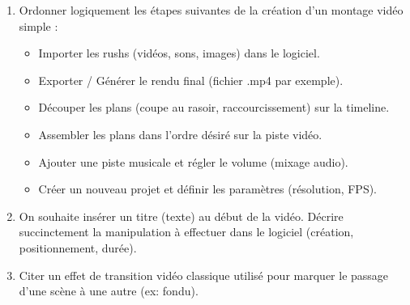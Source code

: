 \documentclass[11pt]{article}
\begin{document}
\begin{exercice}
\begin{enumerate}
    \item Ordonner logiquement les étapes suivantes de la création d'un montage vidéo simple :
    \begin{itemize}
        \item[A] Importer les rushs (vidéos, sons, images) dans le logiciel.
        \item[B] Exporter / Générer le rendu final (fichier .mp4 par exemple).
        \item[C] Découper les plans (coupe au rasoir, raccourcissement) sur la timeline.
        \item[D] Assembler les plans dans l'ordre désiré sur la piste vidéo.
        \item[E] Ajouter une piste musicale et régler le volume (mixage audio).
        \item[F] Créer un nouveau projet et définir les paramètres (résolution, FPS).
    \end{itemize}
    \item On souhaite insérer un titre (texte) au début de la vidéo. Décrire succinctement la manipulation à effectuer dans le logiciel (création, positionnement, durée).
    \item Citer un effet de transition vidéo classique utilisé pour marquer le passage d'une scène à une autre (ex: fondu).
\end{enumerate}
\end{exercice}
\end{document}
